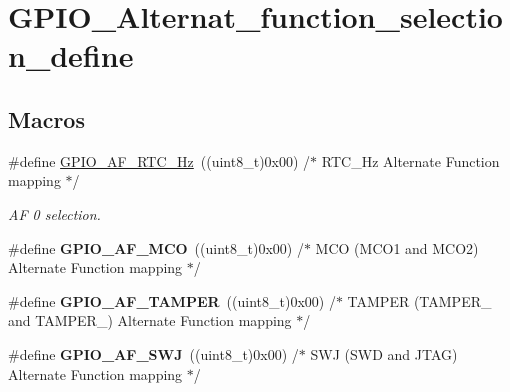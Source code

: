 \hypertarget{group___g_p_i_o___alternat__function__selection__define}{}\section{G\+P\+I\+O\+\_\+\+Alternat\+\_\+function\+\_\+selection\+\_\+define}
\label{group___g_p_i_o___alternat__function__selection__define}
\subsection*{Macros}
\begin{DoxyCompactItemize}
\item 
\#define \hyperlink{group___g_p_i_o___alternat__function__selection__define_ga93071f0121fab9f8f13e59c612ed6291}{G\+P\+I\+O\+\_\+\+A\+F\+\_\+\+R\+T\+C\+\_\+Hz}~((uint8\+\_\+t)0x00)  /$\ast$ R\+T\+C\+\_\+Hz Alternate Function mapping $\ast$/\hypertarget{group___g_p_i_o___alternat__function__selection__define_ga93071f0121fab9f8f13e59c612ed6291}{}\label{group___g_p_i_o___alternat__function__selection__define_ga93071f0121fab9f8f13e59c612ed6291}

\begin{DoxyCompactList}\small\item\em AF 0 selection. \end{DoxyCompactList}\item 
\#define {\bfseries G\+P\+I\+O\+\_\+\+A\+F\+\_\+\+M\+CO}~((uint8\+\_\+t)0x00)  /$\ast$ M\+C\+O (\+M\+C\+O1 and M\+C\+O2) Alternate Function mapping $\ast$/\hypertarget{group___g_p_i_o___alternat__function__selection__define_gacfe2ce01055b82d0fcdd93da513f7cc0}{}\label{group___g_p_i_o___alternat__function__selection__define_gacfe2ce01055b82d0fcdd93da513f7cc0}

\item 
\#define {\bfseries G\+P\+I\+O\+\_\+\+A\+F\+\_\+\+T\+A\+M\+P\+ER}~((uint8\+\_\+t)0x00)  /$\ast$ T\+A\+M\+P\+E\+R (\+T\+A\+M\+P\+E\+R\+\_ and T\+A\+M\+P\+E\+R\+\_) Alternate Function mapping $\ast$/\hypertarget{group___g_p_i_o___alternat__function__selection__define_gac284edf4c3267d864b3d56cc6bf6ac95}{}\label{group___g_p_i_o___alternat__function__selection__define_gac284edf4c3267d864b3d56cc6bf6ac95}

\item 
\#define {\bfseries G\+P\+I\+O\+\_\+\+A\+F\+\_\+\+S\+WJ}~((uint8\+\_\+t)0x00)  /$\ast$ S\+W\+J (\+S\+W\+D and J\+T\+A\+G) Alternate Function mapping $\ast$/\hypertarget{group___g_p_i_o___alternat__function__selection__define_ga63cfa7c46dc0c5ab9cdf7340cc95f7fc}{}\label{group___g_p_i_o___alternat__function__selection__define_ga63cfa7c46dc0c5ab9cdf7340cc95f7fc}


\end{DoxyCompactItemize}
